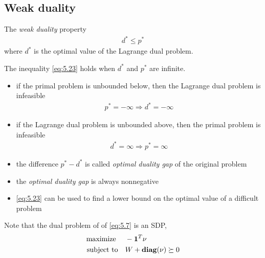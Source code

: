 \subsection{Weak duality}
The \textit{weak duality} property
\begin{align}
  d^\ast\le p^\ast\label{eq:5.23}
\end{align}
where $d^\ast$ is the optimal value of the Lagrange dual problem.\par
The inequality \eqref{eq:5.23} holds when $d^\ast$ and $p^\ast$ are infinite.
\begin{itemize}
  \item if the primal problem is unbounded below, then the Lagrange dual problem is infeasible
        \begin{align*}
          p^\ast=-\infty\Rightarrow d^\ast=-\infty
        \end{align*}
  \item if the Lagrange dual problem is unbounded above, then the primal problem is infeasible
        \begin{align*}
          d^\ast=\infty\Rightarrow p^\ast=\infty
        \end{align*}
  \item the difference $p^\ast-d^\ast$ is called \textit{optimal duality gap} of the original problem
  \item the \textit{optimal duality gap} is always nonnegative
  \item \eqref{eq:5.23} can be used to find a lower bound on the optimal value of a difficult problem
\end{itemize}
Note that the dual problem of of \eqref{eq:5.7} is an SDP,
\begin{align*}
  \text{maximize\;}\quad& -\mathbf 1^T\nu\\
  \text{subject to}\quad& W+\mathop{\bf diag}(\nu)\succeq 0
\end{align*}

